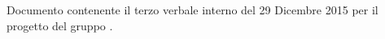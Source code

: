Documento contenente il terzo verbale interno del 29 Dicembre 2015 per il progetto \progetto{} del gruppo \gruppo{}.
